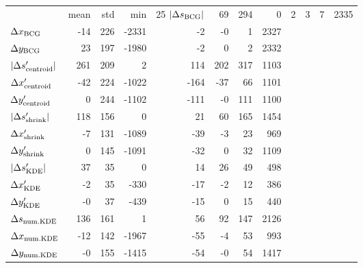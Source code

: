 \begin{tabular}{lrrrrrrr}
\toprule
{} &  mean &  std &   min &  25%
\midrule
$|\Delta s_{\rm BCG}|$       &    69 &  294 &     0 &    2 &    3 &    7 & 2335 \\
$\Delta x_{\rm BCG}$         &   -14 &  226 & -2331 &   -2 &   -0 &    1 & 2327 \\
$\Delta y_{\rm BCG}$         &    23 &  197 & -1980 &   -2 &    0 &    2 & 2332 \\
$|\Delta s_{\rm centroid}'|$ &   261 &  209 &     2 &  114 &  202 &  317 & 1103 \\
$\Delta x_{\rm centroid}'$   &   -42 &  224 & -1022 & -164 &  -37 &   66 & 1101 \\
$\Delta y_{\rm centroid}'$   &     0 &  244 & -1102 & -111 &   -0 &  111 & 1100 \\
$|\Delta s_{\rm shrink}'|$   &   118 &  156 &     0 &   21 &   60 &  165 & 1454 \\
$\Delta x_{\rm shrink}'$     &    -7 &  131 & -1089 &  -39 &   -3 &   23 &  969 \\
$\Delta y_{\rm shrink}'$     &     0 &  145 & -1091 &  -32 &    0 &   32 & 1109 \\
$|\Delta s_{\rm KDE}'|$      &    37 &   35 &     0 &   14 &   26 &   49 &  498 \\
$\Delta x_{\rm KDE}'$        &    -2 &   35 &  -330 &  -17 &   -2 &   12 &  386 \\
$\Delta y_{\rm KDE}'$        &    -0 &   37 &  -439 &  -15 &    0 &   15 &  440 \\
$\Delta s_{\rm num. KDE}$    &   136 &  161 &     1 &   56 &   92 &  147 & 2126 \\
$\Delta x_{\rm num. KDE}$    &   -12 &  142 & -1967 &  -55 &   -4 &   53 &  993 \\
$\Delta y_{\rm num. KDE}$    &    -0 &  155 & -1415 &  -54 &   -0 &   54 & 1417 \\
\bottomrule
\end{tabular}
